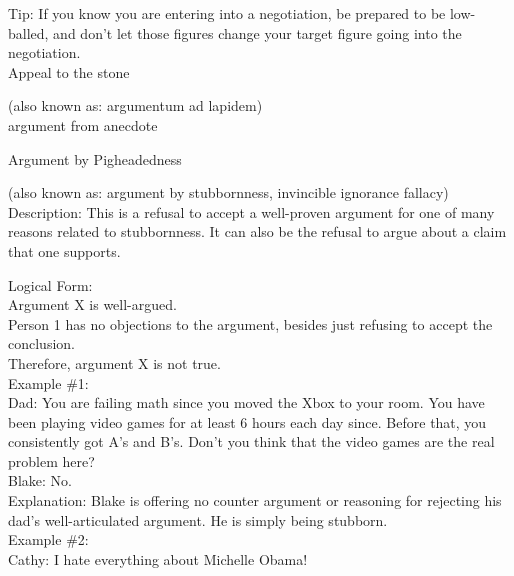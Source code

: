 \documentclass[a4paper,12pt,single,pdftex]{scrbook}
\begin{document}
    
      Tip: If you know you are entering into a negotiation, be prepared to be low-balled, and don’t let those figures change your target figure going into the negotiation. 
    \\

  

Appeal to the stone
    
      (also known as: argumentum ad lapidem)
    \\

  

argument from anecdote

Argument by Pigheadedness
    
      (also known as: argument by stubbornness, invincible ignorance fallacy)
    \\

  
    Description: This is a refusal to accept a well-proven argument for one of many reasons related to stubbornness. It can also be the refusal to argue about a claim that one supports.

    
      Logical Form:
    \\

    
      Argument X is well-argued.
    \\

    
      Person 1 has no objections to the argument, besides just refusing to accept the conclusion.
    \\

    
      Therefore, argument X is not true.
    \\

    
      Example \#1:
    \\

    
      Dad: You are failing math since you moved the Xbox to your room. You have been playing video games for at least 6 hours each day since. Before that, you consistently got A's and B's. Don't you think that the video games are the real problem here?
    \\

    
      Blake: No.
    \\

    
      Explanation: Blake is offering no counter argument or reasoning for rejecting his dad's well-articulated argument. He is simply being stubborn.
    \\

    
      Example \#2:
    \\

    
      Cathy: I hate everything about Michelle Obama!
    \\
\end{document}
